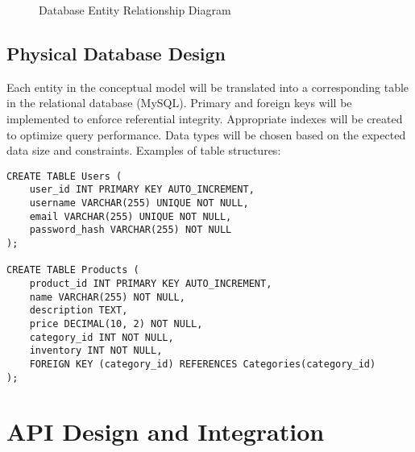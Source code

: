 \documentclass[11pt,a4paper,oneside]{article}
\begin{document}
\begin{figure}[H]
\caption{Database Entity Relationship Diagram}
\label{fig:database-erd}
\end{figure}

\subsection{Physical Database Design}

Each entity in the conceptual model will be translated into a corresponding table in the relational database (MySQL).  Primary and foreign keys will be implemented to enforce referential integrity.  Appropriate indexes will be created to optimize query performance.  Data types will be chosen based on the expected data size and constraints.  Examples of table structures:

\begin{verbatim}
CREATE TABLE Users (
    user_id INT PRIMARY KEY AUTO_INCREMENT,
    username VARCHAR(255) UNIQUE NOT NULL,
    email VARCHAR(255) UNIQUE NOT NULL,
    password_hash VARCHAR(255) NOT NULL
);

CREATE TABLE Products (
    product_id INT PRIMARY KEY AUTO_INCREMENT,
    name VARCHAR(255) NOT NULL,
    description TEXT,
    price DECIMAL(10, 2) NOT NULL,
    category_id INT NOT NULL,
    inventory INT NOT NULL,
    FOREIGN KEY (category_id) REFERENCES Categories(category_id)
);
\end{verbatim}

\section{API Design and Integration}
\end{document}
